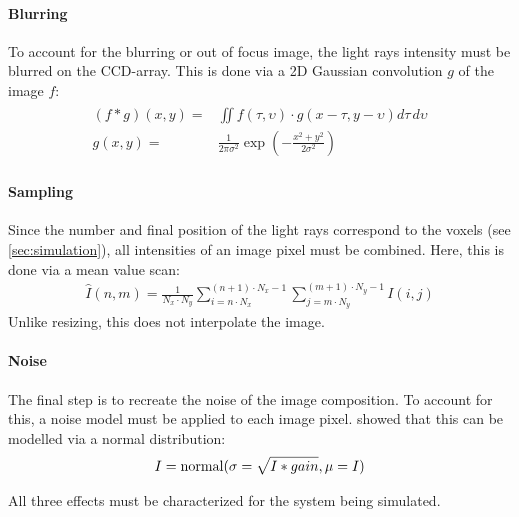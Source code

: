 \paragraph{Blurring}
To account for the blurring or out of focus image, the light rays intensity must be blurred on the \ac{CCD}-array.
This is done via a 2D Gaussian convolution $g$ of the image $f$:
\begin{align}
\begin{split}
    (f * g)(x,y) =& \iint f(\tau,\upsilon) \cdot g(x-\tau, y-\upsilon)d\tau \, d\upsilon\\
    g(x,y) =& \frac{1}{2\pi\sigma^2} \exp(-\frac{x^2+y^2}{2\sigma^2})
\end{split}
\end{align}
%
\paragraph{Sampling}
Since the number and final position of the light rays correspond to the voxels (see \cref{sec:simulation}), all intensities of an image pixel must be combined.
Here, this is done via a mean value scan:
\begin{align}
    \hat{I}(n,m) =\frac{1}{N_x \cdot N_y} \sum_{i=n \cdot N_x}^{(n+1) \cdot N_x-1}\sum_{j=m \cdot N_y}^{(m+1) \cdot N_y-1} I(i,j)
\end{align}
Unlike resizing, this does not interpolate the image.
%
\paragraph{Noise}
The final step is to recreate the noise of the image composition.
To account for this, a noise model must be applied to each image pixel.
\cite{Wiese:887678} showed that this can be modelled via a normal distribution:
%
\begin{align}
    I = \operatorname{normal}(\sigma = \sqrt{I*gain}, \mu=I)
\end{align}
%
\par
%
All three effects must be characterized for the system being simulated.